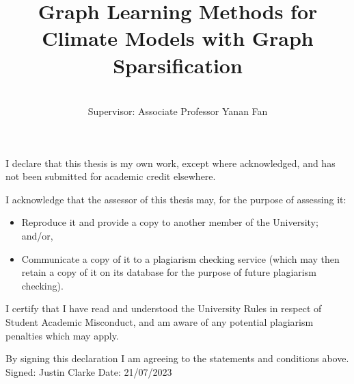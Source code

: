 \documentclass[honours,12pt]{unswthesis}
\title{Graph Learning Methods for Climate Models with Graph Sparsification}
\author{\Authornameonly\\{\bigskip}Supervisor: Associate Professor Yanan Fan}
\newcommand\blankpage{%
    \null
    \thispagestyle{empty}%
    \addtocounter{page}{-1}%
    \newpage}
\numberwithin{equation}{section}
\begin{document}
\graphicspath{ {C:/Users/jqcla/Documents/GitHub/Honours-Thesis/figures/} }

\beforepreface

\afterpage{\blankpage}



\vskip 10pc \noindent I declare that this thesis is my
own work, except where acknowledged, and has not been submitted for
academic credit elsewhere. 

\vskip 2pc  \noindent I acknowledge that the assessor of this
thesis may, for the purpose of assessing it:
\begin{itemize}
\item Reproduce it and provide a copy to another member of the University; and/or,
\item Communicate a copy of it to a plagiarism checking service (which may then retain a copy of it on its database for the purpose of future plagiarism checking).
\end{itemize}

\vskip 2pc \noindent I certify that I have read and understood the University Rules in
respect of Student Academic Misconduct, and am aware of any potential plagiarism penalties which may 
apply.\vspace{24pt}

\vskip 2pc \noindent By signing 
this declaration I am
agreeing to the statements and conditions above.
\vskip 2pc \noindent
Signed: Justin Clarke \hfill Date: 21/07/2023 \newline
\vskip 1pc

\afterpage{\blankpage}







\end{document}
